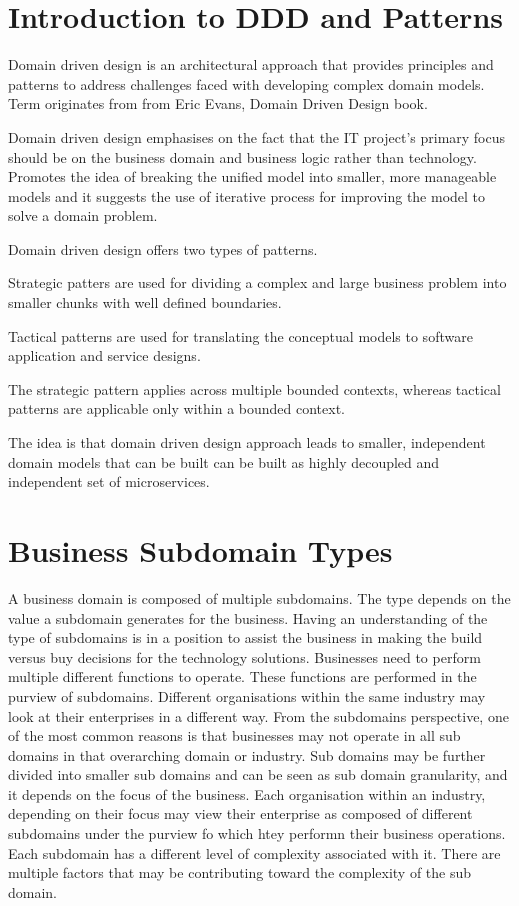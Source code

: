 \section{Introduction to DDD and Patterns}
Domain driven design is an architectural approach that provides principles and patterns to address challenges faced with developing complex domain models.
Term originates from from Eric Evans, Domain Driven Design book.

Domain driven design emphasises on the fact that the IT project's primary focus should be on the business domain and business logic rather than technology.
Promotes the idea of breaking the unified model into smaller, more manageable models and it suggests the use of iterative process for improving the model to solve a domain problem.

Domain driven design offers two types of patterns.

Strategic patters are used for dividing a complex and large business problem into smaller chunks with well defined boundaries.

Tactical patterns are used for translating the conceptual models to software application and service designs.

The strategic pattern applies across multiple bounded contexts, whereas tactical patterns are applicable only within a bounded context.

The idea is that domain driven design approach leads to smaller, independent domain models that can be built can be built as highly decoupled and independent set of microservices.


\section{Business Subdomain Types}
A business domain is composed of multiple subdomains.
The type depends on the value a subdomain generates for the business.
Having an understanding of the type of subdomains is in a position to assist the business in making the build versus buy decisions for the technology solutions.
Businesses need to perform multiple different functions to operate.
These functions are performed in the purview of subdomains.
Different organisations within the same industry may look at their enterprises in a different way.
From the subdomains perspective, one of the most common reasons is that businesses may not operate in all sub domains in that overarching domain or industry.
Sub domains may be further divided into smaller sub domains and can be seen as sub domain granularity, and it depends on the focus of the business.
Each organisation within an industry, depending on their focus may view their enterprise as composed of different subdomains under the purview fo which htey performn their business operations.
Each subdomain has a different level of complexity associated with it.
There are multiple factors that may be contributing toward the complexity of the sub domain.

